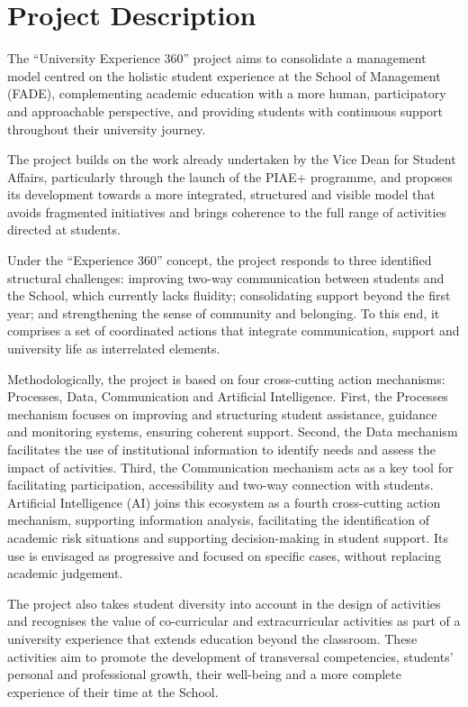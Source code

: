 \documentclass[11pt,a4paper]{scrreprt}
\begin{document}
\section{Project Description}

\small
The ``University Experience 360'' project aims to consolidate a management model centred on the holistic student experience at the School of Management (FADE), complementing academic education with a more human, participatory and approachable perspective, and providing students with continuous support throughout their university journey.

The project builds on the work already undertaken by the Vice Dean for Student Affairs, particularly through the launch of the PIAE+ programme, and proposes its development towards a more integrated, structured and visible model that avoids fragmented initiatives and brings coherence to the full range of activities directed at students.

Under the ``Experience 360'' concept, the project responds to three identified structural challenges: improving two-way communication between students and the School, which currently lacks fluidity; consolidating support beyond the first year; and strengthening the sense of community and belonging. To this end, it comprises a set of coordinated actions that integrate communication, support and university life as interrelated elements.

Methodologically, the project is based on four cross-cutting action mechanisms: Processes, Data, Communication and Artificial Intelligence. First, the Processes mechanism focuses on improving and structuring student assistance, guidance and monitoring systems, ensuring coherent support. Second, the Data mechanism facilitates the use of institutional information to identify needs and assess the impact of activities. Third, the Communication mechanism acts as a key tool for facilitating participation, accessibility and two-way connection with students. Artificial Intelligence (AI) joins this ecosystem as a fourth cross-cutting action mechanism, supporting information analysis, facilitating the identification of academic risk situations and supporting decision-making in student support. Its use is envisaged as progressive and focused on specific cases, without replacing academic judgement.

The project also takes student diversity into account in the design of activities and recognises the value of co-curricular and extracurricular activities as part of a university experience that extends education beyond the classroom. These activities aim to promote the development of transversal competencies, students' personal and professional growth, their well-being and a more complete experience of their time at the School.
\end{document}
